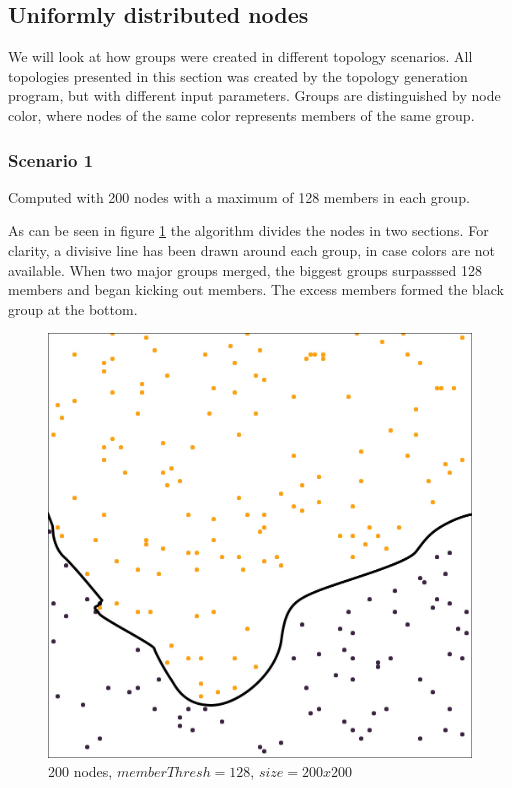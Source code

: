 \subsection{Uniformly distributed nodes}
We will look at how groups were created in different topology scenarios. 
All topologies presented in this section was created by the topology generation program,
but with different input parameters. Groups are distinguished by node color, where nodes
of the same color represents members of the same group. 
\subsubsection{Scenario 1}
Computed with 200 nodes with a maximum of 128 members in each group.

As can be seen in figure \ref{fig:200_128} the algorithm divides the nodes in two
sections. For clarity, a divisive line has been drawn around each group,
in case colors are not available.
When two major groups merged, the biggest groups surpasssed 128 members and began
kicking out members. The excess members formed the black group at the bottom. 

\begin{figure}
\center
\includegraphics[scale=0.45]{Images/grouptest_1.jpg}
\caption{200 nodes, $memberThresh=128$, $size=200x200$}
\label{fig:200_128}
\end{figure}



